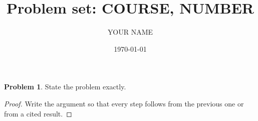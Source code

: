 \documentclass[11pt]{article}
\title{Problem set: COURSE, NUMBER}
\author{YOUR NAME}
\date{\today}
\theoremstyle{definition}\newtheorem{problem}{Problem}
\begin{document}
\maketitle

\begin{problem}
State the problem exactly.
\end{problem}
\begin{proof}
Write the argument so that every step follows from the previous one or from a cited result.
\end{proof}
\end{document}
